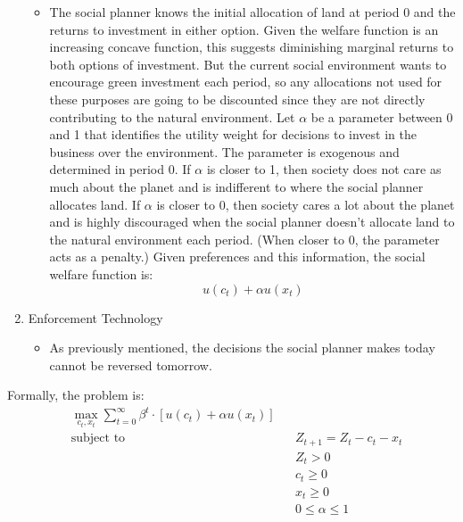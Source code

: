 \documentclass[12pt]{article}
\begin{document}
\begin{enumerate}
\begin{itemize}
		\item The social planner knows the initial allocation of land at period 0 and the returns to investment in either option. Given the welfare function is an increasing concave function, this suggests diminishing marginal returns to both options of investment. But the current social environment wants to encourage green investment each period, so any allocations not used for these purposes are going to be discounted since they are not directly contributing to the natural environment. Let \(\alpha\) be a parameter between 0 and 1 that identifies the utility weight for decisions to invest in the business over the environment. The parameter is exogenous and determined in period 0. If \(\alpha\) is closer to 1, then society does not care as much about the planet and is indifferent to where the social planner allocates land. If \(\alpha\) is closer to 0, then society cares a lot about the planet and is highly discouraged when the social planner doesn't allocate land to the natural environment each period. (When closer to 0, the parameter acts as a penalty.) Given preferences and this information, the social welfare function is: 
		\begin{equation}
			u(c_t) + \alpha u(x_t)
		\end{equation}
	\end{itemize}
	\item Enforcement Technology
	\begin{itemize}
		\item As previously mentioned, the decisions the social planner makes today cannot be reversed tomorrow.
	\end{itemize}
\end{enumerate}

\noindent Formally, the problem is: 
\begin{subequations}
	\begin{alignat}{4}
		&\max_{c_t, x_t} \sum_{t=0}^{\infty} \beta^t \cdot [u(c_t) + \alpha u(x_t)]\\
		&\text{subject to} &      & Z_{t+1} = Z_t - c_t - x_t \\
		&                  &      & Z_t > 0 \\
		&                  &      & c_t \geq 0 \\
		&                  &      & x_t \geq 0 \\
		&                  &      & 0 \leq \alpha \leq 1 \\
	\end{alignat}
\end{subequations}
\end{document}
